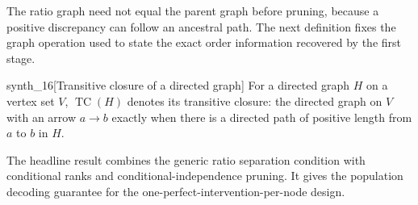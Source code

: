 \documentclass[11pt]{article}
\begin{document}
The ratio graph need not equal the parent graph before pruning, because a positive discrepancy can follow an ancestral path. The next definition fixes the graph operation used to state the exact order information recovered by the first stage.

\begin{definitionv}{synth_16}[Transitive closure of a directed graph]
For a directed graph \(H\) on a vertex set \(V\), \(\operatorname{TC}(H)\) denotes its transitive closure: the directed graph on \(V\) with an arrow \(a\to b\) exactly when there is a directed path of positive length from \(a\) to \(b\) in \(H\).
\end{definitionv}

The headline result combines the generic ratio separation condition with conditional ranks and conditional-independence pruning. It gives the population decoding guarantee for the one-perfect-intervention-per-node design.
\end{document}

